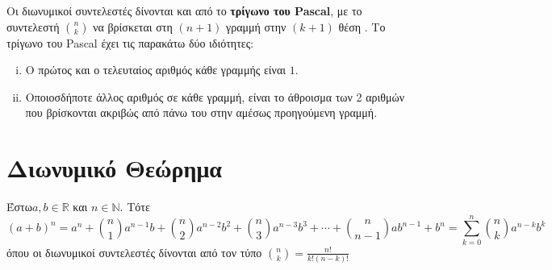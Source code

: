 Οι \textcolor{Col1}{διωνυμικοί συντελεστές} δίνονται και από το 
\textbf{τρίγωνο του Pascal}, με το συντελεστή $ \textstyle{\binom{n}{k}} $ να 
βρίσκεται στη $ (n+1) $ γραμμή στην $ (k+1) $ θέση .
Το τρίγωνο του Pascal έχει τις παρακάτω δύο ιδιότητες:
\begin{enumerate}[i)]\label{en:pasc}
  \item Ο πρώτος και ο τελευταίος αριθμός κάθε γραμμής είναι $1$.
  \item \label{it:pascii} Οποιοσδήποτε άλλος αριθμός σε κάθε γραμμή, είναι το 
    άθροισμα των 2 αριθμών που βρίσκονται ακριβώς από πάνω του στην αμέσως 
    προηγούμενη γραμμή.
\end{enumerate}



\section*{Διωνυμικό Θεώρημα}

Έστω$ a,b \in \mathbb{R} $ και $ n \in \mathbb{N} $. Τότε
\[
  \boxed{(a+b)^{n} = a^{n} + \binom{n}{1} a^{n-1}b + 
    \binom{n}{2} a^{n-2}b^{2} + \binom{n}{3} a^{n-3}b^{3} + \cdots + 
  \binom{n}{n-1} ab^{n-1} + b^{n} = \sum_{k=0}^{n} \binom{n}{k} a^{n-k}b^{k}}
\]
όπου οι διωνυμικοί συντελεστές δίνονται από τον τύπο
$
\binom{n}{k} = \frac{n!}{k!(n-k)!}
$ 

